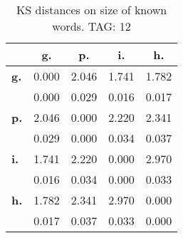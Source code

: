 \begin{table}[h!]
\begin{center}
\begin{tabular}{| l || c | c | c | c |}\hline
 & {\bf g.} & {\bf p.} & {\bf i.} & {\bf h.} \\\hline\hline
{\bf g.} & 0.000 & 2.046 & 1.741 & 1.782 \\
{\bf } & 0.000 & 0.029 & 0.016 & 0.017 \\\hline
{\bf p.} & 2.046 & 0.000 & 2.220 & 2.341 \\
{\bf } & 0.029 & 0.000 & 0.034 & 0.037 \\\hline
{\bf i.} & 1.741 & 2.220 & 0.000 & 2.970 \\
{\bf } & 0.016 & 0.034 & 0.000 & 0.033 \\\hline
{\bf h.} & 1.782 & 2.341 & 2.970 & 0.000 \\
{\bf } & 0.017 & 0.037 & 0.033 & 0.000 \\\hline
\end{tabular}
\caption{KS distances on size of known words. TAG: 12}
\end{center}
\end{table}